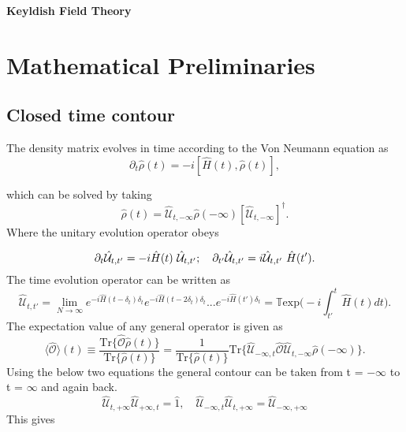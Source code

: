 \documentclass[a4paper, 12pt]{article}
\begin{document}
\begin{center} 
{\Huge{\textbf{Keyldish Field Theory}}}\\
\end{center}

\section {Mathematical Preliminaries}

\subsection {Closed time contour}

The density matrix evolves in time according to the Von Neumann equation as
\begin{equation}%
\partial_t \hat{\rho}(t) = -i [\hat{H}(t), \hat{\rho}(t)],
\end{equation}

which can be solved by taking 
\begin{equation}%
\hat{\rho}(t) = \hat{\mathcal{U}}_{t,-\infty}\hat{\rho}(-\infty) [\hat{\mathcal{U}}_{t,-\infty}]^{\dagger}.
\end{equation}
Where the unitary evolution operator obeys

\begin{equation}%
\partial_t \hat{\mathcal{U}}_{t,t'} = -i \hat{H}(t) \*\ \hat{\mathcal{U}}_{t,t'} ;\quad \partial_{t'} \hat{\mathcal{U}}_{t,t'} = i  \hat{\mathcal{U}}_{t,t'}\*\ \hat{H}(t') .
\end{equation}
The time evolution operator can be written as 
\begin{dmath}
\hat{\mathcal{U}}_{t,t'}  = \lim_{N \to \infty}e^{-i \hat{H}(t-\delta_t)\delta_t}e^{-i \hat{H}(t-2\delta_t)\delta_t}...e^{-i \hat{H}(t')\delta_t}  =\mathbb{T}\mathrm{exp}\bigg(-i \int_{t'}^t \hat{H}(t) dt \bigg).
\end{dmath}
The expectation value of any general operator is given as
\begin{equation}
\langle \hat{\mathcal{O}} \rangle (t) \equiv \frac{\mathrm{Tr}\{\hat{\mathcal{O}}\hat{\rho}(t)\}}{\mathrm{Tr}\{\hat{\rho}(t)\}} = \frac{1}{\mathrm{Tr}\{\hat{\rho}(t)\}} \mathrm{Tr}\{ \hat{\mathcal{U}}_{-\infty,t} \hat{\mathcal{O}} \hat{\mathcal{U}}_{t,-\infty} \hat{\rho}(-\infty)  \}.
\end{equation}
Using the below two equations the general contour can be taken from t = $-\infty$ to t = $\infty$ and again back.
\begin{equation}
\hat{\mathcal{U}}_{t,+\infty}\hat{\mathcal{U}}_{+\infty,t} = \hat{1}, \quad \hat{\mathcal{U}}_{-\infty,t}\hat{\mathcal{U}}_{t,+\infty} = \hat{\mathcal{U}}_{-\infty,+\infty}
\end{equation}
This gives 
\end{document}
